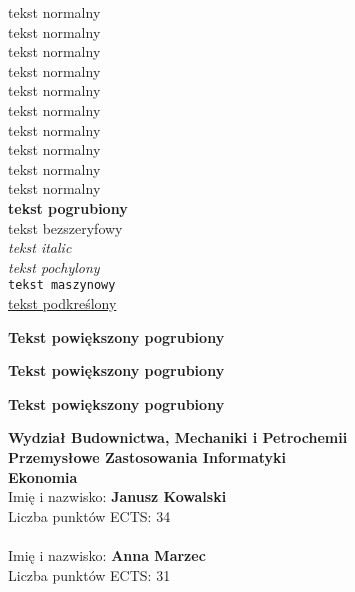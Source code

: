 \documentclass{article}
\newcommand{\wydzial}{\textbf{Wydział Budownictwa, Mechaniki i Petrochemii}}
\newcommand{\kierunek}[1]{\textbf{\textsf{ #1 }}}
\newcommand{\student}[3]{%
Imię i nazwisko: \textbf{#1 #2}	\\
Liczba punktów ECTS: \textsf{#3}\\	
}
\begin{document}
	\noindent
	{\tiny tekst normalny}			\\
	{\scriptsize tekst normalny}	\\
	{\footnotesize tekst normalny}	\\
	{\small tekst normalny}			\\
	tekst normalny					\\
	{\large tekst normalny}			\\
	{\Large tekst normalny}			\\
	{\LARGE tekst normalny}			\\
	{\huge tekst normalny}			\\
	{\Huge tekst normalny}			\\
	
	\noindent
	\textbf{tekst pogrubiony}		\\
	\textsf{tekst bezszeryfowy}		\\
	\textit{tekst italic}			\\
	\textsl{tekst pochylony}		\\
	\texttt{tekst maszynowy}		\\
	\underline{tekst podkreślony}	\\
	
	\begin{center}
		{\Large \textbf{Tekst powiększony pogrubiony}}
	\end{center}
	\begin{center}
		{\textbf{\Large Tekst powiększony pogrubiony}}
	\end{center}
	\begin{center}
		{\Large \textbf{\textsf{Tekst powiększony pogrubiony}}}
	\end{center}
	
	\noindent
	\wydzial	\\
	\kierunek{Przemysłowe Zastosowania Informatyki}	\\
	\kierunek{Ekonomia}	\\
	\student{Janusz}{Kowalski}{34}\\
	\student{Anna}{Marzec}{31}\\
	
\end{document}
